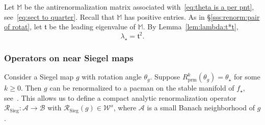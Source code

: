 \documentclass{amsart}
\newcommand{\1}{{\mathbb 1 }}
\newcommand\M{\mathbb M}
\newcommand\RR{\mathcal{R}}
\newcommand\prm{{\operatorname{prm}}}
\newcommand\cRRc{R_{\prm}}%
\newcommand{\str}{{\star}}
\renewcommand{\tt}{\mathfrak{t}}
\newcommand\WW{\mathcal{W}}
\newcommand\BB{\mathcal{B}}
\renewcommand\AA{\mathcal{A}}
\newcommand\Sieg{{\operatorname{Sieg}}}
\theoremstyle{remark}
\numberwithin{equation}{section}
\theoremstyle{definition}
\theoremstyle{nonumberbreak}
\begin{document}
Let $\M$ be the antirenormalization matrix associated with~\eqref{eq:theta is a per pnt}, see~\eqref{eq:sect to quarter}. Recall that $\M$ has positive entries. As in \S\ref{sss:renorm:pair of rotat}, let $\tt$ be the leading eigenvalue of $\M$. By Lemma~\ref{lem:lambda:t*t}, 
\begin{equation}
\label{eq:lambda str is t^2}
\lambda_\str=\tt^2.
\end{equation}


\subsubsection{Operators on near Siegel maps}
\label{sss:from SM to SP}
Consider a Siegel map $g$ with rotation angle $\theta_g$. Suppose $\cRRc^k(\theta_g)=\theta_\str$ for some $k\ge0$. Then  $g$ can be renormalized to a pacman on the stable manifold of $f_\str$, see~\cite[Corollary~3.7 and Lemma~7.8]{DLS}. This allows us to define a compact analytic renormalization operator $\RR_\Sieg\colon\AA\to \BB$ with $\RR_\Sieg (g)\in \WW^s$, where $\AA$ is a small Banach neighborhood of $g$.
\end{document}
